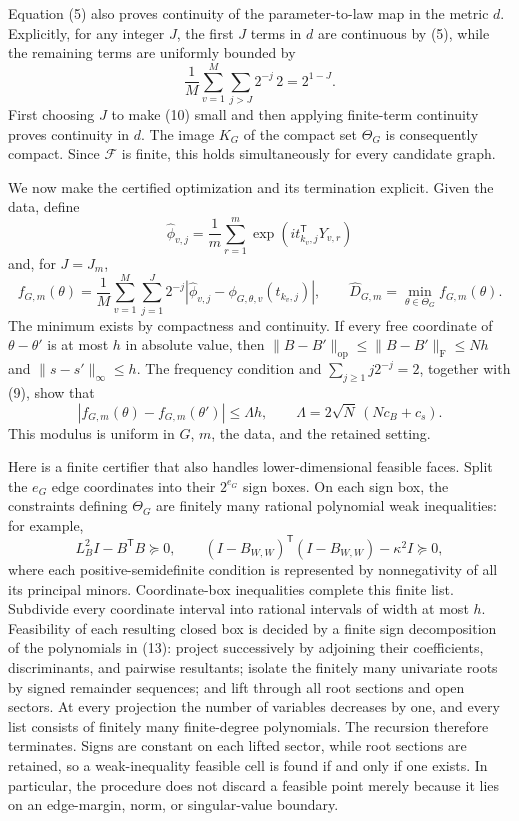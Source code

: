 Equation (5) also proves continuity of the parameter-to-law map in the
metric \(d\).  Explicitly, for any integer \(J\), the first \(J\) terms in
\(d\) are continuous by (5), while the remaining terms are uniformly bounded
by
\[
 \frac1M\sum_{v=1}^M\sum_{j>J}2^{-j}\,2=2^{1-J}.
 \tag{10}
\]
First choosing \(J\) to make (10) small and then applying finite-term
continuity proves continuity in \(d\).  The image \(K_G\) of the compact set
\(\Theta_G\) is consequently compact.  Since \(\mathcal F\) is finite, this
holds simultaneously for every candidate graph.

We now make the certified optimization and its termination explicit.  Given
the data, define
\[
 \widehat\phi_{v,j}
 =\frac1m\sum_{r=1}^m
   \exp\!\left(i t_{k_v,j}^{\mathsf T}Y_{v,r}\right)
\]
and, for \(J=J_m\),
\[
 f_{G,m}(\theta)
 =\frac1M\sum_{v=1}^M\sum_{j=1}^{J}2^{-j}
   |\widehat\phi_{v,j}-\phi_{G,\theta,v}(t_{k_v,j})|,
 \qquad
 \widehat D_{G,m}=\min_{\theta\in\Theta_G}f_{G,m}(\theta).
 \tag{11}
\]
The minimum exists by compactness and continuity.  If every free coordinate
of \(\theta-\theta'\) is at most \(h\) in absolute value, then
\(\lVert B-B'\rVert_{\mathrm{op}}
 \leq\lVert B-B'\rVert_{\mathrm F}\leq Nh\) and
\(\lVert s-s'\rVert_\infty\leq h\).  The frequency condition and
\(\sum_{j\geq1}j2^{-j}=2\), together with (9), show that
\[
 |f_{G,m}(\theta)-f_{G,m}(\theta')|
 \leq \Lambda h,
 \qquad
 \Lambda=2\sqrt N\,(Nc_B+c_s).
 \tag{12}
\]
This modulus is uniform in \(G\), \(m\), the data, and the retained setting.

Here is a finite certifier that also handles lower-dimensional feasible
faces.  Split the \(e_G\) edge coordinates into their \(2^{e_G}\) sign
boxes.  On each sign box, the constraints defining \(\Theta_G\) are finitely
many rational polynomial weak inequalities: for example,
\[
 L_B^2I-B^{\mathsf T}B\succeq0,
 \qquad
 (I-B_{W,W})^{\mathsf T}(I-B_{W,W})-\kappa^2I\succeq0,
 \tag{13}
\]
where each positive-semidefinite condition is represented by nonnegativity
of all its principal minors.  Coordinate-box inequalities complete this
finite list.  Subdivide every coordinate interval into rational intervals of
width at most \(h\).  Feasibility of each resulting closed box is decided by
a finite sign decomposition of the polynomials in (13): project successively
by adjoining their coefficients, discriminants, and pairwise resultants;
isolate the finitely many univariate roots by signed remainder sequences;
and lift through all root sections and open sectors.  At every projection the
number of variables decreases by one, and every list consists of finitely
many finite-degree polynomials.  The recursion therefore terminates.  Signs
are constant on each lifted sector, while root sections are retained, so a
weak-inequality feasible cell is found if and only if one exists.  In
particular, the procedure does not discard a feasible point merely because
it lies on an edge-margin, norm, or singular-value boundary.

